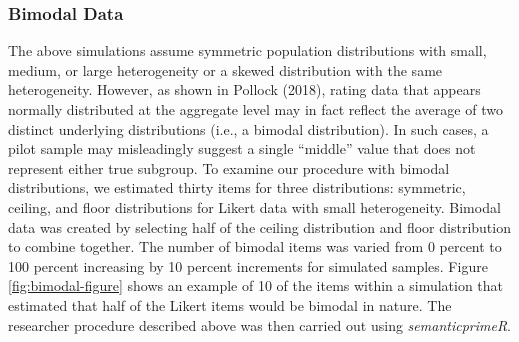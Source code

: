\documentclass[
  man]{apa7}
\begin{document}
\subsubsection{Bimodal Data}\label{bimodal-data}

The above simulations assume symmetric population distributions with small, medium, or large heterogeneity or a skewed distribution with the same heterogeneity. However, as shown in Pollock (2018), rating data that appears normally distributed at the aggregate level may in fact reflect the average of two distinct underlying distributions (i.e., a bimodal distribution). In such cases, a pilot sample may misleadingly suggest a single ``middle'' value that does not represent either true subgroup. To examine our procedure with bimodal distributions, we estimated thirty items for three distributions: symmetric, ceiling, and floor distributions for Likert data with small heterogeneity. Bimodal data was created by selecting half of the ceiling distribution and floor distribution to combine together. The number of bimodal items was varied from 0 percent to 100 percent increasing by 10 percent increments for simulated samples. Figure \ref{fig:bimodal-figure} shows an example of 10 of the items within a simulation that estimated that half of the Likert items would be bimodal in nature. The researcher procedure described above was then carried out using \emph{semanticprimeR}.
\end{document}
